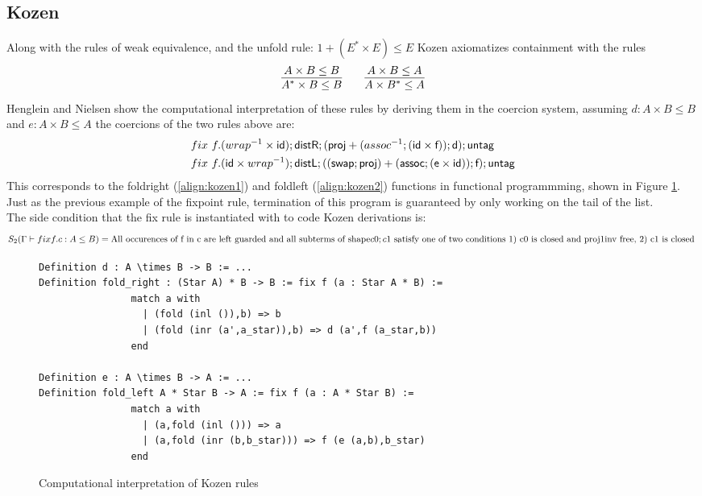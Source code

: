 \documentclass[a4paper,UKenglish,cleveref, autoref, thm-restate]{lipics-v2021}
\begin{document}
\subsection{Kozen}
Along with the rules of weak equivalence, and the unfold rule: $1 + (E^* \times E) \leq E$ Kozen axiomatizes containment with the rules
\begin{displaymath}
\infer{A^* \times B \leq B}{A \times B \leq B} \qquad \infer{A \times B^* \leq A}{A \times B \leq A}
\end{displaymath}
Henglein and Nielsen show the  computational interpretation of these rules by deriving them in the coercion system, assuming $d : A \times B \leq B $ and $e : A \times B \leq A $ the coercions of the two rules above are:
\begin{align}
&\fix~f.(\dslcominv{wrap}\times \dslcom{id}); \dslcom{distR};(\dslcom{proj} + (\dslcominv{assoc};(\dslcom{id} \times \dslcom{f}));\dslcom{d});\dslcom{untag}\label{align:kozen1}\\
&\fix~f.( \dslcom{id} \times \dslcominv{wrap}); \dslcom{distL};((\dslcom{swap};\dslcom{proj}) + (\dslcom{assoc};(\dslcom{e} \times \dslcom{id}));\dslcom{f});\dslcom{untag}\label{align:kozen2}
\end{align}
This corresponds to the  \textsf{foldright} (\ref{align:kozen1}) and \textsf{foldleft} (\ref{align:kozen2}) functions in functional programmming, shown in Figure \ref{figure:kozen}. Just as the previous example of the fixpoint rule, termination of this program is guaranteed by only working on the tail of the list.\\
The side condition that the fix rule is instantiated with to code Kozen derivations is:
\[S_2(\containsG{fix f. c}{A}{B}) = \text{All occurences of f in c are left guarded and all subterms of shape} c0;c1 \text{ satisfy one of two conditions 1) c0 is closed and proj1inv free, 2) c1 is closed } \]
\begin{figure}\label{figure:kozen}
\caption{Computational interpretation of Kozen rules}
  \centering
  \begin{verbatim}
Definition d : A \times B -> B := ...
Definition fold_right : (Star A) * B -> B := fix f (a : Star A * B) := 
                match a with 
                  | (fold (inl ()),b) => b 
                  | (fold (inr (a',a_star)),b) => d (a',f (a_star,b))
                end

Definition e : A \times B -> A := ...
Definition fold_left A * Star B -> A := fix f (a : A * Star B) := 
                match a with 
                  | (a,fold (inl ())) => a
                  | (a,fold (inr (b,b_star))) => f (e (a,b),b_star)
                end
\end{verbatim}
\end{figure}
\end{document}
